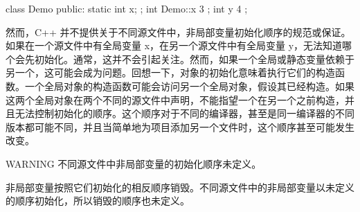 \begin{cpp}
class Demo
{
    public:
        static int x;
};
int Demo::x { 3 };
int y { 4 };
\end{cpp}

然而，C++ 并不提供关于不同源文件中，非局部变量初始化顺序的规范或保证。如果在一个源文件中有全局变量 x，在另一个源文件中有全局变量 y，无法知道哪个会先初始化。通常，这并不会引起关注。然而，如果一个全局或静态变量依赖于另一个，这可能会成为问题。回想一下，对象的初始化意味着执行它们的构造函数。一个全局对象的构造函数可能会访问另一个全局对象，假设其已经构造。如果这两个全局对象在两个不同的源文件中声明，不能指望一个在另一个之前构造，并且无法控制初始化的顺序。这个顺序对于不同的编译器，甚至是同一编译器的不同版本都可能不同，并且当简单地为项目添加另一个文件时，这个顺序甚至可能发生改变。

\begin{myWarning}{WARNING}
不同源文件中非局部变量的初始化顺序未定义。
\end{myWarning}



非局部变量按照它们初始化的相反顺序销毁。不同源文件中的非局部变量以未定义的顺序初始化，所以销毁的顺序也未定义。




















